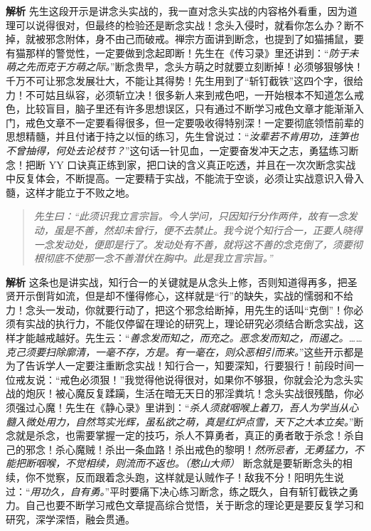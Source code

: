 \textbf{解析} 先生这段开示是讲念头实战的，我一直对念头实战的内容格外看重，因为道理可以说得很对，但最终的检验还是断念实战！念头入侵时，就看你怎么办？断不掉，就被邪念附体，身不由己而破戒。禅宗方面讲到断念，也提到了如猫捕鼠，要有猫那样的警觉性，一定要做到念起即断！先生在《传习录》里还讲到：“\textit{防于未萌之先而克于方萌之际。}”断念贵早，念头方萌之时就要立刻断掉！必须够狠够快！千万不可让邪念发展壮大，不能让其得势！先生用到了“斩钉截铁”这四个字，很给力！不可姑且纵容，必须斩立决！很多新人来到戒色吧，一开始根本不知道怎么戒色，比较盲目，脑子里还有许多思想误区，只有通过不断学习戒色文章才能渐渐入门，戒色文章不一定要看得很多，但一定要吸收得特别深！一定要彻底领悟前辈的思想精髓，并且付诸于持之以恒的练习，先生曾说过：“\textit{汝辈若不肯用功，连笋也不曾抽得，何处去论枝节？}”这句话一针见血，一定要奋发冲天之志，勇猛练习断念！把断 YY 口诀真正练到家，把口诀的含义真正吃透，并且在一次次断念实战中反复体会，不断提高。一定要精于实战，不能流于空谈，必须让实战意识入骨入髓，这样才能立于不败之地。

\begin{quote}\it
    先生曰：“此须识我立言宗旨。今人学问，只因知行分作两件，故有一念发动，虽是不善，然却未曾行，便不去禁止。我今说个知行合一，正要人晓得一念发动处，便即是行了。发动处有不善，就将这不善的念克倒了，须要彻根彻底不使那一念不善潜伏在胸中。此是我立言宗旨。”
\end{quote}

\textbf{解析} 这条也是讲实战，知行合一的关键就是从念头上修，否则知道得再多，把圣贤开示倒背如流，但是却不懂得修心，这样就是“行”的缺失，实战的懦弱和不给力！念头一发动，你就要行动了，把这个邪念给断掉，用先生的话叫“克倒”！你必须有实战的执行力，不能仅停留在理论的研究上，理论研究必须结合断念实战，这样才能越戒越好。先生云：“\textit{善念发而知之，而充之。恶念发而知之，而遏之。……克己须要扫除廓清，一毫不存，方是。有一毫在，则众恶相引而来。}”这些开示都是为了告诉学人一定要注重断念实战！知行合一，知要深知，行要狠行！前段时间一位戒友说：“戒色必须狠！”我觉得他说得很对，如果你不够狠，你就会沦为念头实战的炮灰！被心魔反复蹂躏，生活在暗无天日的邪淫粪坑！念头实战很残酷，你必须强过心魔！先生在《静心录》里讲到：“\textit{杀人须就咽喉上着刀，吾人为学当从心髓入微处用力，自然笃实光辉，虽私欲之萌，真是红炉点雪，天下之大本立矣。}”断念就是杀念，也需要掌握一定的技巧，杀人不算勇者，真正的勇者敢于杀念！杀自己的邪念！杀心魔贼！杀出一条血路！杀出戒色的黎明！\textit{然所忌者，无勇猛力，不能把断咽喉，不觉相续，则流而不返也。（憨山大师）} 断念就是要斩断念头的相续，你不觉察，反而跟着念头跑，这样就是认贼作子！敌我不分！阳明先生说过：“\textit{用功久，自有勇。}”平时要痛下决心练习断念，练之既久，自有斩钉截铁之勇力。自己也要不断学习戒色文章提高综合觉悟，关于断念的理论更是要反复学习和研究，深学深悟，融会贯通。

